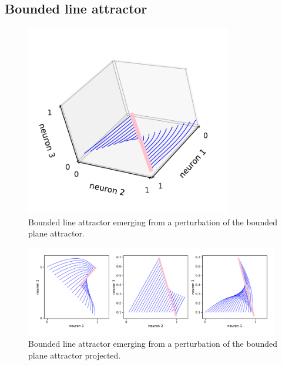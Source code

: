 \documentclass{article}
\theoremstyle{definition}
\theoremstyle{remark}
\begin{document}
\subsection{Bounded line attractor}
\begin{figure}[H]
    \centering
    \includegraphics[width=0.8\textwidth]{figures/bpa3_bla.pdf}
    \caption{Bounded line attractor emerging from a perturbation of the bounded plane attractor.}
    \label{fig:bpa3_bla}
\end{figure}


\begin{figure}[H]
    \centering
    \includegraphics[width=0.99\textwidth]{figures/bpa3_bla_2dproj.pdf}
    \caption{Bounded line attractor emerging from a perturbation of the bounded plane attractor projected.}
    \label{fig:bla3_bla_2d}
\end{figure}


{}



%
\end{document}
